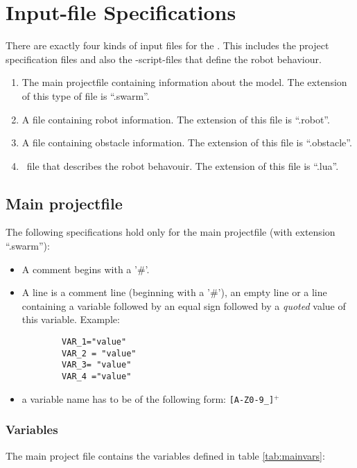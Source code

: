 
\section{Input-file Specifications}

There are exactly four kinds of input files for the \RSS. This includes the project specification files and also the \Lua-script-files that define the robot behaviour.
\begin{enumerate}
	\item The main projectfile containing information about the model. The extension of this type of file is "`.swarm"'.
	\item A file containing robot information. The extension of this file is "`.robot"'.
	\item A file containing obstacle information. The extension of this file is "`.obstacle"'.
	\item \Lua\ file that describes the robot behavouir. The extension of this file is "`.lua"'.
\end{enumerate}


\subsection{Main projectfile}
The following specifications hold only for the main projectfile (with extension "`.swarm"'):
\begin{itemize}
	\item A comment begins with a '\#'.
	\item A line is a comment line (beginning with a '\#'), an empty line or a line containing a variable followed by an equal sign followed by a \emph{quoted} value of this variable. Example:
	\begin{verbatim}
		VAR_1="value"
		VAR_2 = "value"
		VAR_3= "value"
		VAR_4 ="value"
	\end{verbatim}
	\item a variable name has to be of the following form: \texttt{[A-Z0-9\_]$^+$}
\end{itemize}
\subsubsection{Variables}
	The main project file contains the variables defined in table \ref{tab:mainvars}:\\

